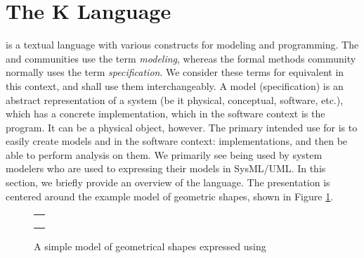 \section{The K Language}
\label{sec:k}

\Klang{} is a textual language with various constructs for
modeling and programming. The \uml{} and \sysml{} communities use the term {\em modeling}, whereas the formal methods community normally uses the term {\em specification}. We consider these terms for equivalent in this context, and shall use them interchangeably. A model (specification) is an abstract representation
of a system (be it physical, conceptual, software, etc.), which has a concrete implementation, which in the software context is the program. It can be a physical
object, however. The primary intended use for \Klang{} is to easily create models and in the software context: implementations, and then be able to 
perform analysis on them. We primarily see \Klang{} being used by 
system modelers who are used to
expressing their models in SysML/UML. In this section, we briefly
provide an overview of the \Klang{} language. The presentation is centered
around the example \Klang{} model of geometric shapes, shown in Figure 
\ref{fig:shapes}.

\begin{figure}
\centering
\begin{tabular}{c}
\hline \\
 \\ \\
\hline
\end{tabular}
\caption{A simple model of geometrical shapes expressed using \Klang{}}
\label{fig:shapes}
\end{figure}


